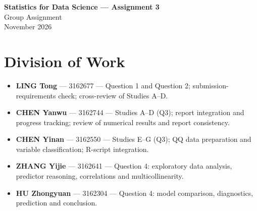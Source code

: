 \begin{center}
{\LARGE\bfseries Statistics for Data Science --- Assignment 3}\\[6pt]
{\large Group Assignment}\\[4pt]
{\normalsize November 2026}
\end{center}
\section*{Division of Work}
\begin{itemize}\setlength\itemsep{3pt}
\item \textbf{LING Tong} --- 3162677 --- Question 1 and Question 2; submission-requirements check; cross-review of Studies A--D.
\item \textbf{CHEN Yanwu} --- 3162744 --- Studies A--D (Q3); report integration and progress tracking; review of numerical results and report consistency.
\item \textbf{CHEN Yinan} --- 3162550 --- Studies E--G (Q3); QQ data preparation and variable classification; R-script integration.
\item \textbf{ZHANG Yijie} --- 3162641 --- Question 4: exploratory data analysis, predictor reasoning, correlations and multicollinearity.
\item \textbf{HU Zhongyuan} --- 3162304 --- Question 4: model comparison, diagnostics, prediction and conclusion.
\end{itemize}
